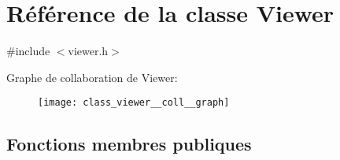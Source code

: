 \hypertarget{class_viewer}{}\section{Référence de la classe Viewer}
\label{class_viewer}


{\ttfamily \#include $<$viewer.\+h$>$}



Graphe de collaboration de Viewer\+:\nopagebreak
\begin{figure}[H]
\begin{center}
\leavevmode
\texttt{[image: class\_viewer\_\_coll\_\_graph]}
\end{center}
\end{figure}
\subsection*{Fonctions membres publiques}
